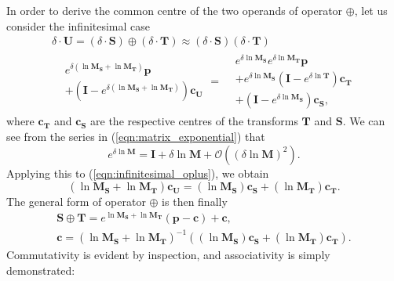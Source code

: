         In order to derive the common centre of the two operands of operator $\oplus$, let us consider the infinitesimal case
        \begin{gather}
          \delta \cdot \mathbf{U} = (\delta \cdot \mathbf{S}) \oplus (\delta \cdot \mathbf{T}) \approx (\delta \cdot \mathbf{S}) (\delta \cdot \mathbf{T}) \\
          \begin{aligned}
            &e^{\delta(\ln \mathbf{M_S} + \ln \mathbf{M_T})}\mathbf{p} \\
            &+ (\mathbf{I} - e^{\delta(\ln \mathbf{M_S} + \ln \mathbf{M_T})})\mathbf{c_U}
          \end{aligned} = \begin{aligned}
              &e^{\delta \ln \mathbf{M_S}}e^{\delta \ln \mathbf{M_T}}\mathbf{p} \\
              &+ e^{\delta \ln \mathbf{M_S}}(\mathbf{I} - e^{\delta \ln \mathbf{T}})\mathbf{c_T} \\
              &+ (\mathbf{I} - e^{\delta \ln \mathbf{M_S}})\mathbf{c_S}, \label{eqn:infinitesimal_oplus}
          \end{aligned}
        \end{gather}
        where $\mathbf{c_T}$ and $\mathbf{c_S}$ are the respective centres of the transforms $\mathbf{T}$ and $\mathbf{S}$.
        We can see from the series in (\ref{eqn:matrix_exponential}) that
        \begin{equation}
          e^{\delta \ln \mathbf{M}} = \mathbf{I} + \delta \ln \mathbf{M} + \mathcal{O}((\delta \ln \mathbf{M})^2).
        \end{equation}
        Applying this to (\ref{eqn:infinitesimal_oplus}), we obtain
        \begin{equation}
          (\ln\mathbf{M_S} + \ln\mathbf{M_T})\mathbf{c_U} = (\ln\mathbf{M_S})\mathbf{c_S} + (\ln\mathbf{M_T})\mathbf{c_T}.
        \end{equation}
        The general form of operator $\oplus$ is then finally
        \begin{gather}
          \mathbf{S} \oplus \mathbf{T} = e^{\ln\mathbf{M_S} + \ln\mathbf{M_T}}(\mathbf{p} - \mathbf{c}) + \mathbf{c}, \nonumber \\
          \mathbf{c} = (\ln\mathbf{M_S} + \ln\mathbf{M_T})^{-1}((\ln\mathbf{M_S})\mathbf{c_S} + (\ln\mathbf{M_T})\mathbf{c_T}). \label{eqn:affine_oplus}
        \end{gather}
        Commutativity is evident by inspection, and associativity is simply demonstrated:
